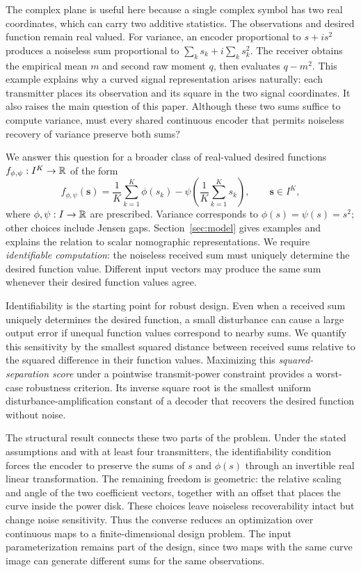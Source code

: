 The complex plane is useful here because a single complex symbol has two real coordinates, which can carry two additive statistics. The observations and desired function remain real valued. For variance, an encoder proportional to $s+i s^2$ produces a noiseless sum proportional to $\sum_k s_k+i\sum_k s_k^2$. The receiver obtains the empirical mean $m$ and second raw moment $q$, then evaluates $q-m^2$. This example explains why a curved signal representation arises naturally: each transmitter places its observation and its square in the two signal coordinates. It also raises the main question of this paper. Although these two sums suffice to compute variance, must every shared continuous encoder that permits noiseless recovery of variance preserve both sums?

We answer this question for a broader class of real-valued desired functions $f_{\phi,\psi}:I^K\to\mathbb R$ of the form
$$
 f_{\phi,\psi}(\mathbf s)
 =\frac1K\sum_{k=1}^{K}\phi(s_k)
 -\psi\!\left(\frac1K\sum_{k=1}^{K}s_k\right),
 \qquad \mathbf s\in I^K,
$$
where $\phi,\psi:I\to\mathbb R$ are prescribed. Variance corresponds to $\phi(s)=\psi(s)=s^2$; other choices include Jensen gaps. Section~\ref{sec:model} gives examples and explains the relation to scalar nomographic representations. We require \emph{identifiable computation}: the noiseless received sum must uniquely determine the desired function value. Different input vectors may produce the same sum whenever their desired function values agree.

Identifiability is the starting point for robust design. Even when a received sum uniquely determines the desired function, a small disturbance can cause a large output error if unequal function values correspond to nearby sums. We quantify this sensitivity by the smallest squared distance between received sums relative to the squared difference in their function values. Maximizing this \emph{squared-separation score} under a pointwise transmit-power constraint provides a worst-case robustness criterion. Its inverse square root is the smallest uniform disturbance-amplification constant of a decoder that recovers the desired function without noise.

The structural result connects these two parts of the problem. Under the stated assumptions and with at least four transmitters, the identifiability condition forces the encoder to preserve the sums of $s$ and $\phi(s)$ through an invertible real linear transformation. The remaining freedom is geometric: the relative scaling and angle of the two coefficient vectors, together with an offset that places the curve inside the power disk. These choices leave noiseless recoverability intact but change noise sensitivity. Thus the converse reduces an optimization over continuous maps to a finite-dimensional design problem. The input parameterization remains part of the design, since two maps with the same curve image can generate different sums for the same observations.

